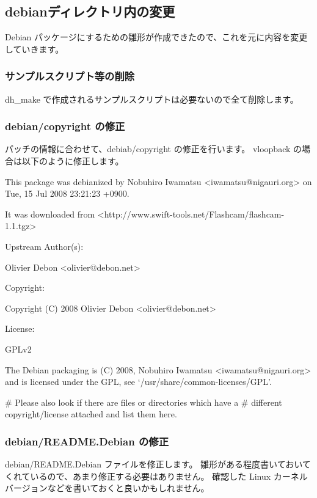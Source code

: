 \documentclass[mingoth,a4paper]{jsarticle}
\begin{document}
\subsection{debianディレクトリ内の変更}
Debian パッケージにするための雛形が作成できたので、これを元に内容を変更していきます。

\subsubsection{サンプルスクリプト等の削除}
dh\_make で作成されるサンプルスクリプトは必要ないので全て削除します。

\subsubsection{debian/copyright の修正}
パッチの情報に合わせて、debiab/copyright の修正を行います。
vloopback の場合は以下のように修正します。

\begin{commandline}
This package was debianized by Nobuhiro Iwamatsu <iwamatsu@nigauri.org> on
Tue, 15 Jul 2008 23:21:23 +0900.

It was downloaded from <http://www.swift-tools.net/Flashcam/flashcam-1.1.tgz>

Upstream Author(s):

    Olivier Debon <olivier@debon.net>

Copyright:

    Copyright (C) 2008 Olivier Debon <olivier@debon.net>

License:

    GPLv2

The Debian packaging is (C) 2008, Nobuhiro Iwamatsu <iwamatsu@nigauri.org> and
is licensed under the GPL, see `/usr/share/common-licenses/GPL'.

# Please also look if there are files or directories which have a
# different copyright/license attached and list them here.
\end{commandline}

\subsubsection{debian/README.Debian の修正}
debian/README.Debian ファイルを修正します。
雛形がある程度書いておいてくれているので、あまり修正する必要はありません。
確認した Linux カーネルバージョンなどを書いておくと良いかもしれません。
\end{document}
